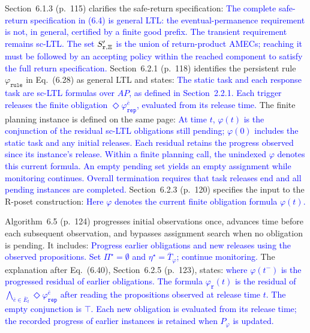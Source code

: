 \documentclass[11pt]{article}
\newcommand{\change}[1]{\textcolor{blue}{#1}}
\begin{document}
\begin{itemize}
Section~6.1.3 (p.~115) clarifies the safe-return specification:
\change{The complete safe-return specification in (6.4) is
general LTL: the eventual-permanence requirement is not, in general, certified
by a finite good prefix. The transient requirement remains sc-LTL. The set
\(S'_{\textup{\texttt{r}},\Xi}\) is the union of return-product AMECs;
reaching it must be followed by an accepting policy within the reached
component to satisfy the full return specification.}
Section~6.2.1 (p.~118) identifies the persistent rule
$\varphi_{\texttt{rule}}$ in Eq.~(6.28) as general LTL and states:
\change{The static task and each response task are sc-LTL formulas over $AP$, as
defined in Section~2.2.1.}
\change{Each trigger releases the finite obligation
$\Diamond\varphi_{\texttt{rep}}^{\bar e}$, evaluated from its release time.}
The finite planning instance is defined on the same page:
\change{At time $t$, $\varphi(t)$ is the conjunction of the residual sc-LTL
obligations still pending; $\varphi(0)$ includes the static task and any
initial releases. Each residual retains the progress observed since its
instance's release. Within a finite planning call, the unindexed
$\varphi$ denotes this current formula.}
\change{An empty pending set yields an empty assignment while
monitoring continues. Overall termination requires that task releases end
and all pending instances are completed.}
Section~6.2.3 (p.~120) specifies the input to the R-poset construction:
\change{Here $\varphi$ denotes the current finite obligation formula $\varphi(t)$.}

Algorithm~6.5 (p.~124) progresses initial observations once, advances time
before each subsequent observation, and bypasses assignment search when no
obligation is pending. It includes:
\change{Progress earlier obligations and new releases using the observed propositions.}
\change{Set $\Pi^\star=\emptyset$ and $\eta^\star=\overline T_\varphi$; continue
monitoring.}
The explanation after Eq.~(6.40), Section~6.2.5 (p.~123), states:
\change{where $\varphi(t^-)$ is the progressed residual of earlier obligations.
The formula $\varphi_{\texttt r}(t)$ is the residual of
$\bigwedge_{\bar e\in\bar E_t}\Diamond\varphi_{\texttt{rep}}^{\bar e}$
after reading the propositions observed at release time $t$.
The empty conjunction is $\top$.
Each new obligation is evaluated from its release time; the recorded progress
of earlier instances is retained when $P_\varphi$ is updated.}
\end{itemize}
\end{document}
